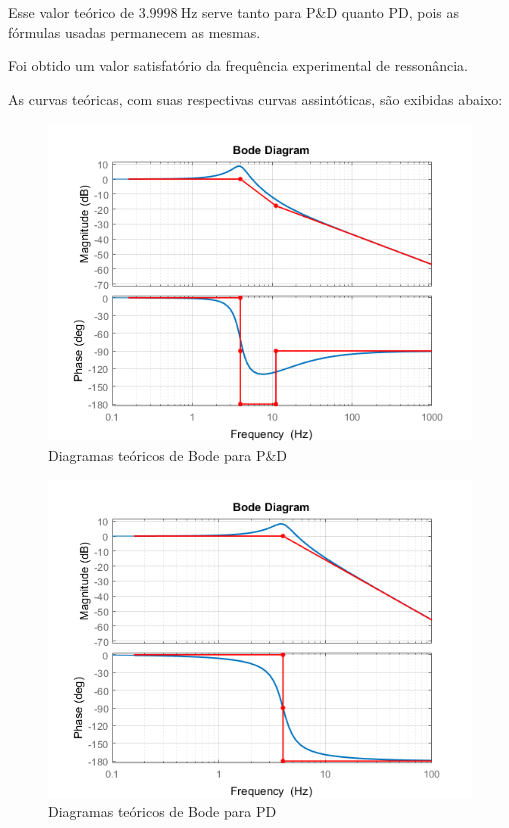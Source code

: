 \documentclass[a4paper,11pt]{article}
\begin{document}
Esse valor teórico de $3.9998 ~ \text{Hz}$ serve tanto para P\&D quanto PD, pois
as fórmulas usadas permanecem as mesmas.

Foi obtido um valor satisfatório da frequência experimental de ressonância.


As curvas teóricas, com suas respectivas curvas assintóticas, são exibidas
abaixo:

\begin{figure}[H]
\includegraphics{q14-ped-bode-teor-assint}
\caption{Diagramas teóricos de Bode para P\&D}
\centering
\end{figure}

\begin{figure}[H]
\includegraphics{q14-pd-bode-teor-assint}
\caption{Diagramas teóricos de Bode para PD}
\centering
\end{figure}
\end{document}
